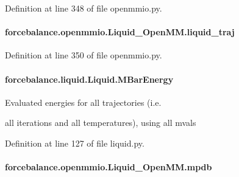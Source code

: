 Definition at line 348 of file openmmio.\-py.

\hypertarget{classforcebalance_1_1openmmio_1_1Liquid__OpenMM_a113b333fdca5faedc03600d204c3a49b}{
\paragraph[{liquid\-\_\-traj}]{\setlength{\rightskip}{0pt plus 5cm}forcebalance.\-openmmio.\-Liquid\-\_\-\-Open\-M\-M.\-liquid\-\_\-traj}}\label{classforcebalance_1_1openmmio_1_1Liquid__OpenMM_a113b333fdca5faedc03600d204c3a49b}


Definition at line 350 of file openmmio.\-py.

\hypertarget{classforcebalance_1_1liquid_1_1Liquid_a6c00a87ae43f535118b77d41af51a5d7}{
\paragraph[{M\-Bar\-Energy}]{\setlength{\rightskip}{0pt plus 5cm}forcebalance.\-liquid.\-Liquid.\-M\-Bar\-Energy\hspace{0.3cm}{\ttfamily [inherited]}}}\label{classforcebalance_1_1liquid_1_1Liquid_a6c00a87ae43f535118b77d41af51a5d7}


Evaluated energies for all trajectories (i.\-e. 

all iterations and all temperatures), using all mvals 

Definition at line 127 of file liquid.\-py.

\hypertarget{classforcebalance_1_1openmmio_1_1Liquid__OpenMM_aaaa8d66c5bb45d847e1fbcd3953fe0d3}{
\paragraph[{mpdb}]{\setlength{\rightskip}{0pt plus 5cm}forcebalance.\-openmmio.\-Liquid\-\_\-\-Open\-M\-M.\-mpdb}}\label{classforcebalance_1_1openmmio_1_1Liquid__OpenMM_aaaa8d66c5bb45d847e1fbcd3953fe0d3}


